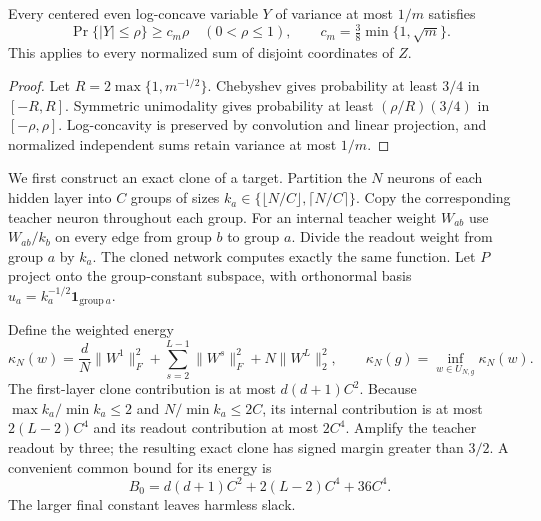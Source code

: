 \begin{lemma}\label{lem:small-ball}
Every centered even log-concave variable $Y$ of variance at most $1/m$
satisfies
\[
 \Pr\{|Y|\leq\rho\}\geq c_m\rho\quad(0<\rho\leq1),
 \qquad c_m=\tfrac38\min\{1,\sqrt m\}.
\]
This applies to every normalized sum of disjoint coordinates of $Z$.
\end{lemma}
\begin{proof}
Let $R=2\max\{1,m^{-1/2}\}$. Chebyshev gives probability at least
$3/4$ in $[-R,R]$. Symmetric unimodality gives probability at least
$(\rho/R)(3/4)$ in $[-\rho,\rho]$. Log-concavity is preserved by
convolution and linear projection, and normalized independent sums retain
variance at most $1/m$.
\end{proof}

We first construct an exact clone of a target. Partition the $N$ neurons
of each hidden layer into $C$ groups of sizes $k_a\in\{\lfloor N/C\rfloor,
\lceil N/C\rceil\}$. Copy the corresponding teacher neuron throughout
each group. For an internal teacher weight $W_{ab}$ use $W_{ab}/k_b$
on every edge from group $b$ to group $a$. Divide the readout weight
from group $a$ by $k_a$. The cloned network computes exactly the same
function. Let $P$ project onto the group-constant subspace, with orthonormal
basis $u_a=k_a^{-1/2}\mathbf1_{\mathrm{group}\ a}$.

Define the weighted energy
\begin{equation}\label{eq:kappa}
 \kappa_N(w)=\frac dN\|W^1\|_F^2+
     \sum_{s=2}^{L-1}\|W^s\|_F^2+N\|W^L\|_2^2,
 \qquad \kappa_N(g)=\inf_{w\in U_{N,g}}\kappa_N(w).
\end{equation}
The first-layer clone contribution is at most $d(d+1)C^2$.
Because $\max k_a/\min k_a\leq2$ and $N/\min k_a\leq2C$,
its internal contribution is at most $2(L-2)C^4$ and its readout
contribution at most $2C^4$. Amplify the teacher readout by three; the
resulting exact clone has signed margin greater than $3/2$. A convenient
common bound for its energy is
\begin{equation}\label{eq:B0}
 B_0=d(d+1)C^2+2(L-2)C^4+36C^4.
\end{equation}
The larger final constant leaves harmless slack.

